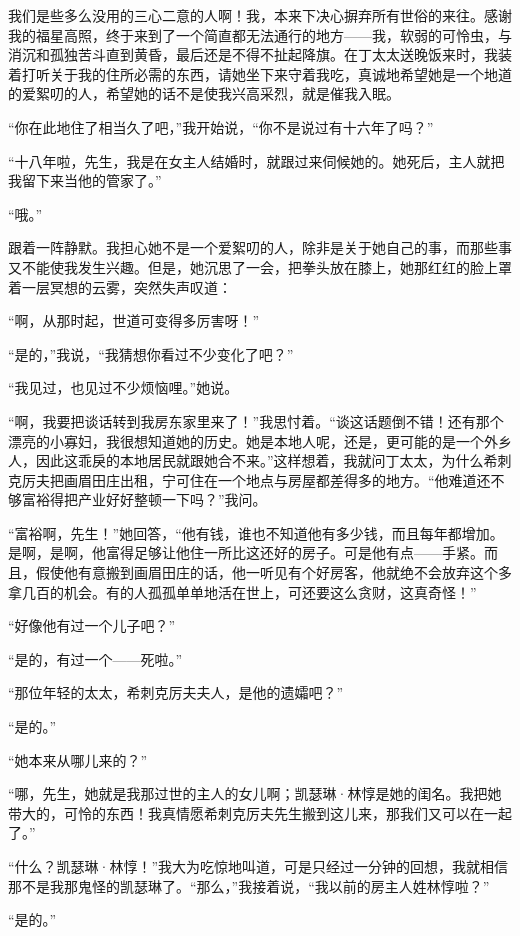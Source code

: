 \par 我们是些多么没用的三心二意的人啊！我，本来下决心摒弃所有世俗的来往。感谢我的福星高照，终于来到了一个简直都无法通行的地方——我，软弱的可怜虫，与消沉和孤独苦斗直到黄昏，最后还是不得不扯起降旗。在丁太太送晚饭来时，我装着打听关于我的住所必需的东西，请她坐下来守着我吃，真诚地希望她是一个地道的爱絮叨的人，希望她的话不是使我兴高采烈，就是催我入眠。
\par “你在此地住了相当久了吧，”我开始说，“你不是说过有十六年了吗？”
\par “十八年啦，先生，我是在女主人结婚时，就跟过来伺候她的。她死后，主人就把我留下来当他的管家了。”
\par “哦。”
\par 跟着一阵静默。我担心她不是一个爱絮叨的人，除非是关于她自己的事，而那些事又不能使我发生兴趣。但是，她沉思了一会，把拳头放在膝上，她那红红的脸上罩着一层冥想的云雾，突然失声叹道：
\par “啊，从那时起，世道可变得多厉害呀！”
\par “是的，”我说，“我猜想你看过不少变化了吧？”
\par “我见过，也见过不少烦恼哩。”她说。
\par “啊，我要把谈话转到我房东家里来了！”我思忖着。“谈这话题倒不错！还有那个漂亮的小寡妇，我很想知道她的历史。她是本地人呢，还是，更可能的是一个外乡人，因此这乖戾的本地居民就跟她合不来。”这样想着，我就问丁太太，为什么希刺克厉夫把画眉田庄出租，宁可住在一个地点与房屋都差得多的地方。“他难道还不够富裕得把产业好好整顿一下吗？”我问。
\par “富裕啊，先生！”她回答，“他有钱，谁也不知道他有多少钱，而且每年都增加。是啊，是啊，他富得足够让他住一所比这还好的房子。可是他有点——手紧。而且，假使他有意搬到画眉田庄的话，他一听见有个好房客，他就绝不会放弃这个多拿几百的机会。有的人孤孤单单地活在世上，可还要这么贪财，这真奇怪！”
\par “好像他有过一个儿子吧？”
\par “是的，有过一个——死啦。”
\par “那位年轻的太太，希刺克厉夫夫人，是他的遗孀吧？”
\par “是的。”
\par “她本来从哪儿来的？”
\par “哪，先生，她就是我那过世的主人的女儿啊；凯瑟琳·林惇是她的闺名。我把她带大的，可怜的东西！我真情愿希刺克厉夫先生搬到这儿来，那我们又可以在一起了。”
\par “什么？凯瑟琳·林惇！”我大为吃惊地叫道，可是只经过一分钟的回想，我就相信那不是我那鬼怪的凯瑟琳了。“那么，”我接着说，“我以前的房主人姓林惇啦？”
\par “是的。”
